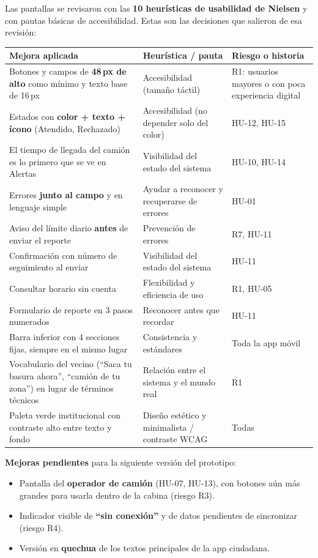 \documentclass[11pt,a4paper]{article}
\begin{document}
Las pantallas se revisaron con las \textbf{10 heurísticas de usabilidad de Nielsen} y con pautas básicas de accesibilidad. Estas son las decisiones que salieron de esa revisión:

{\small
\begin{longtable}{L{6.4cm} L{4.6cm} L{4.4cm}}
\toprule
\textbf{Mejora aplicada} & \textbf{Heurística / pauta} & \textbf{Riesgo o historia} \\
\midrule
\endhead
Botones y campos de \textbf{48\,px de alto} como mínimo y texto base de 16\,px & Accesibilidad (tamaño táctil) & R1: usuarios mayores o con poca experiencia digital \\
Estados con \textbf{color + texto + ícono} (Atendido, Rechazado) & Accesibilidad (no depender solo del color) & HU-12, HU-15 \\
El tiempo de llegada del camión es lo primero que se ve en Alertas & Visibilidad del estado del sistema & HU-10, HU-14 \\
Errores \textbf{junto al campo} y en lenguaje simple & Ayudar a reconocer y recuperarse de errores & HU-01 \\
Aviso del límite diario \textbf{antes} de enviar el reporte & Prevención de errores & R7, HU-11 \\
Confirmación con número de seguimiento al enviar & Visibilidad del estado del sistema & HU-11 \\
Consultar horario sin cuenta & Flexibilidad y eficiencia de uso & R1, HU-05 \\
Formulario de reporte en 3 pasos numerados & Reconocer antes que recordar & HU-11 \\
Barra inferior con 4 secciones fijas, siempre en el mismo lugar & Consistencia y estándares & Toda la app móvil \\
Vocabulario del vecino (``Saca tu basura ahora'', ``camión de tu zona'') en lugar de términos técnicos & Relación entre el sistema y el mundo real & R1 \\
Paleta verde institucional con contraste alto entre texto y fondo & Diseño estético y minimalista / contraste WCAG & Todas \\
\bottomrule
\end{longtable}
}

\textbf{Mejoras pendientes} para la siguiente versión del prototipo:
\begin{itemize}
  \item Pantalla del \textbf{operador de camión} (HU-07, HU-13), con botones aún más grandes para usarla dentro de la cabina (riesgo R3).
  \item Indicador visible de \textbf{``sin conexión''} y de datos pendientes de sincronizar (riesgo R4).
  \item Versión en \textbf{quechua} de los textos principales de la app ciudadana.
\end{itemize}
\end{document}
